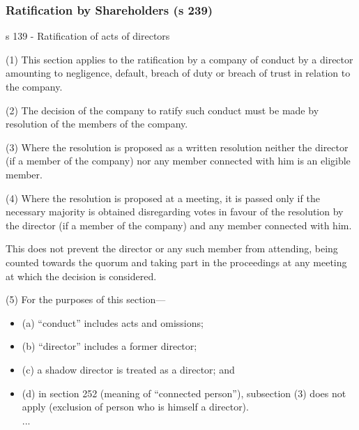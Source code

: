 \documentclass[
]{article}
\providecommand{\tightlist}{%
  \setlength{\itemsep}{0pt}\setlength{\parskip}{0pt}}
\newenvironment{env-136e818f-6bd8-45c9-b7d8-e6b8925f9e62}
{
    \savenotes\tcolorbox[blanker,breakable,left=5pt,borderline west={2pt}{-4pt}{green}]
}
{
    \endtcolorbox\spewnotes
}
\begin{document}
\hypertarget{ratification-by-shareholders-s-239}{%
\subsubsection{Ratification by Shareholders (s
239)}\label{ratification-by-shareholders-s-239}}

\begin{env-136e818f-6bd8-45c9-b7d8-e6b8925f9e62}

s 139 - Ratification of acts of directors

(1) This section applies to the ratification by a company of conduct by
a director amounting to negligence, default, breach of duty or breach of
trust in relation to the company.

(2) The decision of the company to ratify such conduct must be made by
resolution of the members of the company.

(3) Where the resolution is proposed as a written resolution neither the
director (if a member of the company) nor any member connected with him
is an eligible member.

(4) Where the resolution is proposed at a meeting, it is passed only if
the necessary majority is obtained disregarding votes in favour of the
resolution by the director (if a member of the company) and any member
connected with him.

This does not prevent the director or any such member from attending,
being counted towards the quorum and taking part in the proceedings at
any meeting at which the decision is considered.

(5) For the purposes of this section---

\begin{itemize}
\tightlist
\item
  (a) ``conduct'' includes acts and omissions;
\item
  (b) ``director'' includes a former director;
\item
  (c) a shadow director is treated as a director; and
\item
  (d) in section 252 (meaning of ``connected person''), subsection (3)
  does not apply (exclusion of person who is himself a director).\\
  ...
\end{itemize}

\end{env-136e818f-6bd8-45c9-b7d8-e6b8925f9e62}
\end{document}

